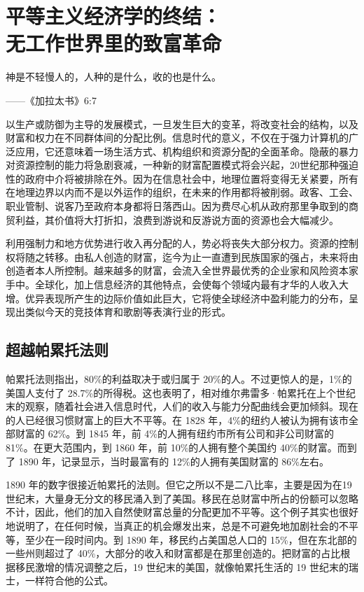 \chapter[平等主义经济学的终结]{平等主义经济学的终结：\\无工作世界里的致富革命}

\begin{tcolorbox}
\kaishu 神是不轻慢人的，人种的是什么，收的也是什么。
\begin{flushright}
——《加拉太书》6:7 
\end{flushright} 
\end{tcolorbox}

以生产或防御为主导的发展模式，一旦发生巨大的变革，将改变社会的结构，以及财富和权力在不同群体间的分配比例。信息时代的意义，不仅在于强力计算机的广泛应用，它还意味着一场生活方式、机构组织和资源分配的全面革命。隐蔽的暴力对资源控制的能力将急剧衰减，一种新的财富配置模式将会兴起，20世纪那种强迫性的政府中介将被排除在外。因为在信息社会中，地理位置将变得无关紧要，所有在地理边界以内而不是以外运作的组织，在未来的作用都将被削弱。政客、工会、职业管制、说客乃至政府本身都将日落西山。因为费尽心机从政府那里争取到的商贸利益，其价值将大打折扣，浪费到游说和反游说方面的资源也会大幅减少。

利用强制力和地方优势进行收入再分配的人，势必将丧失大部分权力。资源的控制权将随之转移。由私人创造的财富，迄今为止一直遭到民族国家的强占，未来将由创造者本人所控制。越来越多的财富，会流入全世界最优秀的企业家和风险资本家手中。全球化，加上信息经济的其他特点，会使每个领域内最有才华的人收入大增。优异表现所产生的边际价值如此巨大，它将使全球经济中盈利能力的分布，呈现出类似今天的竞技体育和歌剧等表演行业的形式。

\section{超越帕累托法则}

帕累托法则指出，80\%的利益取决于或归属于 20\%的人。不过更惊人的是，1\%的美国人支付了 28.7\%的所得税。这也表明了，相对维尔弗雷多·帕累托在上个世纪末的观察，随着社会进入信息时代，人们的收入与能力分配曲线会更加倾斜。现在的人已经很习惯财富上的巨大不平等。在 1828 年，4\%的纽约人被认为拥有该市全部财富的 62\%。到 1845 年，前 4\%的人拥有纽约市所有公司和非公司财富的 81\%。在更大范围内，到 1860 年，前 10\%的人拥有整个美国约 40\%的财富。而到了 1890 年，记录显示，当时最富有的 12\%的人拥有美国财富的 86\%左右。

1890 年的数字很接近帕累托的法则。但它之所以不是二八比率，主要是因为在19 世纪末，大量身无分文的移民涌入到了美国。移民在总财富中所占的份额可以忽略不计，因此，他们的加入自然使财富总量的分配更加不平等。这个例子其实也很好地说明了，在任何时候，当真正的机会爆发出来，总是不可避免地加剧社会的不平等，至少在一段时间内。到 1890 年，移民约占美国总人口的 15\%，但在东北部的一些州则超过了 40\%，大部分的收入和财富都是在那里创造的。把财富的占比根据移民激增的情况调整之后，19 世纪末的美国，就像帕累托生活的 19 世纪末的瑞士，一样符合他的公式。


